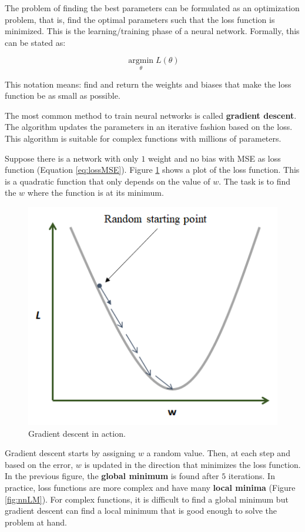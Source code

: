 \documentclass[
  11pt,
]{krantz}
\begin{document}
The problem of finding the best parameters can be formulated as an optimization problem, that is, find the optimal parameters such that the loss function is minimized. This is the learning/training phase of a neural network. Formally, this can be stated as:

\begin{equation}
  \operatorname*{arg min}_{\theta} L(\theta)
  \label{eq:minLoss}
\end{equation}

This notation means: find and return the weights and biases that make the loss function be as small as possible.

The most common method to train neural networks is called \textbf{gradient descent}. The algorithm updates the parameters in an iterative fashion based on the loss. This algorithm is suitable for complex functions with millions of parameters.

Suppose there is a network with only \(1\) weight and no bias with MSE as loss function (Equation \eqref{eq:lossMSE}). Figure \ref{fig:nnGD} shows a plot of the loss function. This is a quadratic function that only depends on the value of \(w\). The task is to find the \(w\) where the function is at its minimum.

\begin{figure}

{\centering \includegraphics[width=0.5\linewidth]{images/nn_gd} 

}

\caption{Gradient descent in action.}\label{fig:nnGD}
\end{figure}

Gradient descent starts by assigning \(w\) a random value. Then, at each step and based on the error, \(w\) is updated in the direction that minimizes the loss function. In the previous figure, the \textbf{global minimum} is found after \(5\) iterations. In practice, loss functions are more complex and have many \textbf{local minima} (Figure \ref{fig:nnLM}). For complex functions, it is difficult to find a global minimum but gradient descent can find a local minimum that is good enough to solve the problem at hand.
\end{document}

